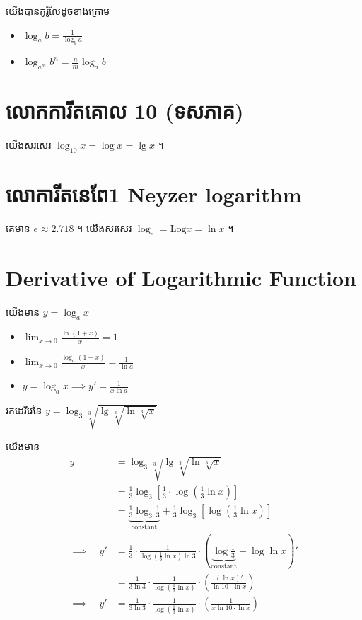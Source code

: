\begin{corollary}
យើងបានកូរ៉ូលែដូចខាងក្រោម
\begin{itemize}
\item $\log_ab=\frac{1}{\log_ba}$
\item $\log_{a^m}b^n=\frac{n}{m}\log_ab$
\end{itemize}
\end{corollary}


\section{លោកការីតគោល 10 (ទសភាគ)}
យើងសរសេរ $\log_{10}x=\log x=\lg x$ ។

\section{លោការីតនេពែ1 Neyzer logarithm}
គេមាន $e\approx 2.718$ ។ យើងសរសេរ $\log_e=\mathrm{Log} x=\ln x$ ។

\section{Derivative of Logarithmic Function}
យើងមាន $y=\log_ax$
\begin{itemize}
\item $\lim_{x\to 0}\frac{\ln(1+x)}{x}=1$
\item $\lim_{x\to 0}\frac{\log_a (1+x)}{x}=\frac{1}{\ln a}$
\item $y=\log_ax\implies y'=\frac{1}{x\ln a}$
\end{itemize}

\newpage
\begin{example}
រកដេរីវេនៃ $y=\log_3\sqrt[3]{\lg\sqrt[3]{\ln\sqrt[3]{x}}}$
\end{example}
\begin{solution}
យើងមាន
\begin{align*}
y&=\log_3\sqrt[3]{\lg\sqrt[3]{\ln\sqrt[3]{x}}}\\
 &=\frac{1}{3}\log_3\left[\frac{1}{3}\cdot\log\left(\frac{1}{3}\ln x\right)\right]\\
 &=\underbrace{\frac{1}{3}\log_3\frac{1}{3}}_{\text{constant}}+
 \frac{1}{3}\log_3\left[\log\left(\frac{1}{3}\ln x\right)\right]\\
\implies\quad
y'&=\frac{1}{3}\cdot\frac{1}{\log\left(\frac{1}{3}\ln x\right)\ln 3}\cdot
  \left(\underbrace{\log\frac{1}{3}}_{\text{constant}}+\log\ln x\right)'\\
  &=\frac{1}{3\ln 3}\cdot\frac{1}{\log\left(\frac{1}{3}\ln x\right)}\cdot
  \left(\frac{(\ln x)'}{\ln 10\cdot\ln x}\right)\\
\implies\quad
y'  
  &=\boxed{\frac{1}{3\ln 3}\cdot\frac{1}{\log\left(\frac{1}{3}\ln x\right)}\cdot
  \left(\frac{1}{x\ln 10\cdot\ln x}\right)}
\end{align*}
\end{solution}

















